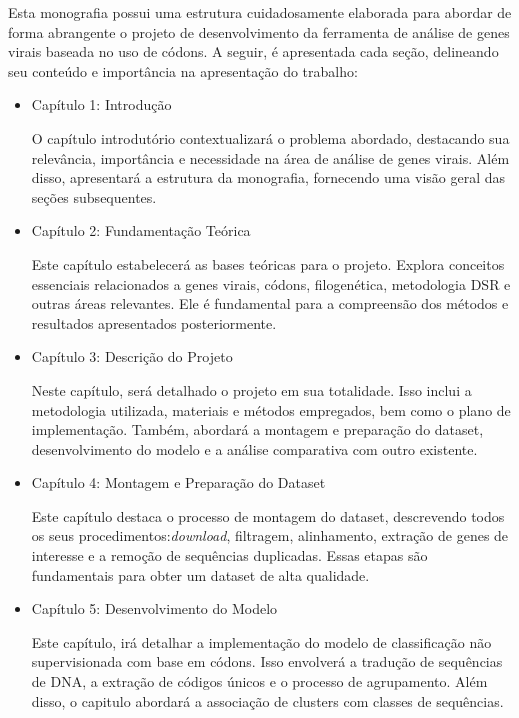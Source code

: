 Esta monografia possui uma estrutura cuidadosamente elaborada para abordar de forma abrangente o projeto de desenvolvimento da ferramenta de análise de genes virais baseada no uso de códons. A seguir, é apresentada cada seção, delineando seu conteúdo e importância na apresentação do trabalho:

\begin{itemize}
      \item Capítulo 1: Introdução

            O capítulo introdutório contextualizará o problema abordado, destacando sua relevância, importância e necessidade na área de análise de genes virais. Além disso, apresentará a estrutura da monografia, fornecendo uma visão geral das seções subsequentes.

      \item Capítulo 2: Fundamentação Teórica

            Este capítulo estabelecerá as bases teóricas para o projeto. Explora conceitos essenciais relacionados a genes virais, códons, filogenética, metodologia DSR e outras áreas relevantes. Ele é fundamental para a compreensão dos métodos e resultados apresentados posteriormente.

      \item Capítulo 3: Descrição do Projeto

            Neste capítulo, será detalhado o projeto em sua totalidade. Isso inclui a metodologia utilizada, materiais e métodos empregados, bem como o plano de implementação. Também, abordará a montagem e preparação do dataset, desenvolvimento do modelo e a análise comparativa com outro existente.

      \item Capítulo 4: Montagem e Preparação do Dataset

            Este capítulo destaca o processo de montagem do dataset, descrevendo todos os seus procedimentos:\textit{download}, filtragem, alinhamento, extração de genes de interesse e a remoção de sequências duplicadas. Essas etapas são fundamentais para obter um dataset de alta qualidade.

      \item Capítulo 5: Desenvolvimento do Modelo

            Este capítulo, irá detalhar a implementação do modelo de classificação não supervisionada com base em códons. Isso envolverá a tradução de sequências de DNA, a extração de códigos únicos e o processo de agrupamento. Além disso, o capitulo abordará a associação de clusters com classes de sequências.


\end{itemize}
